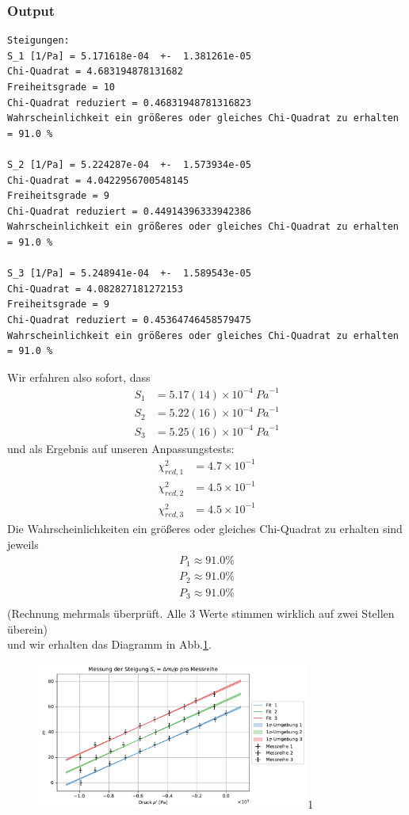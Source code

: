 \documentclass[a4paper,10pt]{article}
\begin{document}
\subsubsection{Output}
\begin{lstlisting}
Steigungen: 
S_1 [1/Pa] = 5.171618e-04  +-  1.381261e-05
Chi-Quadrat = 4.683194878131682
Freiheitsgrade = 10
Chi-Quadrat reduziert = 0.46831948781316823
Wahrscheinlichkeit ein größeres oder gleiches Chi-Quadrat zu erhalten = 91.0 %

S_2 [1/Pa] = 5.224287e-04  +-  1.573934e-05
Chi-Quadrat = 4.0422956700548145
Freiheitsgrade = 9
Chi-Quadrat reduziert = 0.44914396333942386
Wahrscheinlichkeit ein größeres oder gleiches Chi-Quadrat zu erhalten = 91.0 %

S_3 [1/Pa] = 5.248941e-04  +-  1.589543e-05
Chi-Quadrat = 4.082827181272153
Freiheitsgrade = 9
Chi-Quadrat reduziert = 0.45364746458579475
Wahrscheinlichkeit ein größeres oder gleiches Chi-Quadrat zu erhalten = 91.0 %

\end{lstlisting}
Wir erfahren also sofort, dass
\begin{align*}
S_1&=5.17(14)\times10^{-4}\:{Pa}^{-1}\\
S_2&=5.22(16)\times10^{-4}\:{Pa}^{-1}\\
S_3&=5.25(16)\times10^{-4}\:{Pa}^{-1}
\end{align*}
und als Ergebnis auf unseren Anpassungstests:
\begin{align*}
\chi^{2}_{red,1}&=4.7\times10^{-1}\\
\chi^{2}_{red,2}&=4.5\times10^{-1}\\
\chi^{2}_{red,3}&=4.5\times10^{-1}
\end{align*}
Die Wahrscheinlichkeiten ein größeres oder gleiches Chi-Quadrat zu erhalten sind jeweils
\begin{align*}
P_1\approx  91.0 \%\\
P_2\approx  91.0 \%\\
P_3\approx  91.0 \%\\
\end{align*}
(Rechnung mehrmals überprüft. Alle 3 Werte stimmen wirklich auf zwei Stellen überein)\\
und wir erhalten das Diagramm in Abb.\ref{fig:Fig2}.

\begin{figure}[htb]
  \centering
  \begin{annotate}{\includegraphics[width=0.8\textwidth]{232_Fig2.pdf}}{1}
  \end{annotate}
\caption{}
\label{fig:Fig2}
\end{figure}
\end{document}
